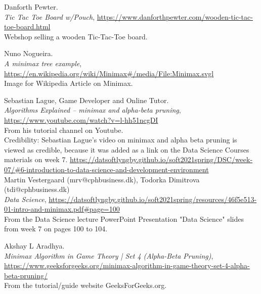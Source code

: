 \begin{thebibliography}{1}
    \label{thebibliography}

    \label{bib:Tic-Tac-ToeBoard}
    Danforth Pewter.\\
    \textit{Tic Tac Toe Board w/Pouch}, \url{https://www.danforthpewter.com/wooden-tic-tac-toe-board.html}\\
    Webshop selling a wooden Tic-Tac-Toe board.

    \label{bib:MinimaxTreeExample}
    Nuno Nogueira.\\
    \textit{A minimax tree example}, \url{https://en.wikipedia.org/wiki/Minimax#/media/File:Minimax.svgl}\\
    Image for Wikipedia Article on Minimax.

    \label{bib:MinimaxVideo}
    Sebastian Lague, Game Developer and Online Tutor.\\
    \textit{Algorithms Explained – minimax and alpha-beta pruning}, \url{https://www.youtube.com/watch?v=l-hh51ncgDI}\\
    From his tutorial channel on Youtube.\\
    Credibility: Sebastian Lague's video on minimax and alpha beta pruning is viewed as credible, because it was added as a link on the Data Science Courses materials on week 7.
    \url{https://datsoftlyngby.github.io/soft2021spring/DSC/week-07/#6-introduction-to-data-science-and-development-environment}\\


    \label{bib:AlphaBetaSlides}
    Martin Vestergaard (mrv@cphbusiness.dk), Todorka Dimitrova (tdi@cphbusiness.dk)\\
    \textit{Data Science}, \url{https://datsoftlyngby.github.io/soft2021spring/resources/46f5e513-01-intro-and-minimax.pdf#page=100}\\
    From the Data Science lecture PowerPoint Presentation "Data Science" slides from week 7 on pages 100 to 104.

    \label{bib:MinimaxAlphaBetaArticle}
    Akshay L Aradhya.\\
    \textit{Minimax Algorithm in Game Theory | Set 4 (Alpha-Beta Pruning)}, \url{https://www.geeksforgeeks.org/minimax-algorithm-in-game-theory-set-4-alpha-beta-pruning/}\\
    From the tutorial/guide website GeeksForGeeks.org.


\end{thebibliography}
